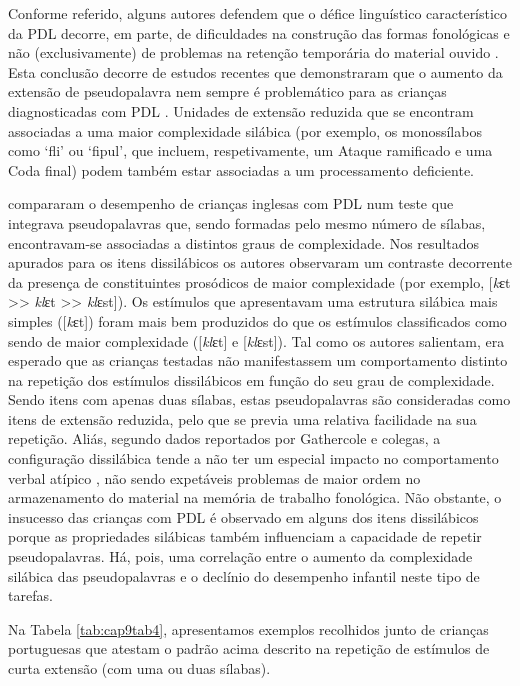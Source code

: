 \documentclass[output=paper,colorlinks,citecolor=brown,booklanguage=portuguese]{langscibook}
\begin{document}
Conforme referido, alguns autores defendem que o défice linguístico característico da PDL decorre, em parte, de dificuldades na construção das formas fonológicas e não (exclusivamente) de problemas na retenção temporária do material ouvido \citep{Almeida2019, Gallon2007, Marshall2002, Marshall2003, Marshall2009}. Esta conclusão decorre de estudos recentes que demonstraram que o aumento da extensão de pseudopalavra nem sempre é problemático para as crianças diagnosticadas com PDL \citep{Estes2007}. Unidades de extensão reduzida que se encontram associadas a uma maior complexidade silábica (por exemplo, os monossílabos como ‘fli’ ou ‘fipul’, que incluem, respetivamente, um Ataque ramificado e uma Coda final) podem também estar associadas a um processamento deficiente.

\citet{Gallon2007} compararam o desempenho de crianças inglesas com PDL num teste que integrava pseudopalavras que, sendo formadas pelo mesmo número de sílabas, encontravam-se associadas a distintos graus de complexidade. Nos resultados apurados para os itens dissilábicos os autores observaram um contraste decorrente da presença de constituintes prosódicos de maior complexidade (por exemplo, [\emph{k}ɛt  >> \emph{kl}ɛt >> \emph{kl}ɛst]). Os estímulos que apresentavam uma estrutura silábica mais simples ([\emph{k}ɛt]) foram mais bem produzidos do que os estímulos classificados como sendo de maior complexidade ([\emph{kl}ɛt] e [\emph{kl}ɛst]). Tal como os autores salientam, era esperado que as crianças testadas não manifestassem um comportamento distinto na repetição dos estímulos dissilábicos em função do seu grau de complexidade. Sendo itens com apenas duas sílabas, estas pseudopalavras são consideradas como itens de extensão reduzida, pelo que se previa uma relativa facilidade na sua repetição. Aliás, segundo dados reportados por Gathercole e colegas, a configuração dissilábica tende a não ter um especial impacto no comportamento verbal atípico \citep{Gathercole1990, Gathercole1994, Gathercole2006}, não sendo expetáveis problemas de maior ordem no armazenamento do material na memória de trabalho fonológica. Não obstante, o insucesso das crianças com PDL é observado em alguns dos itens dissilábicos porque as propriedades silábicas também influenciam a capacidade de repetir pseudopalavras. Há, pois, uma correlação entre o aumento da complexidade silábica das pseudopalavras e o declínio do desempenho infantil neste tipo de tarefas.

Na Tabela \ref{tab:cap9tab4}, apresentamos exemplos recolhidos junto de crianças portuguesas que atestam o padrão acima descrito na repetição de estímulos de curta extensão (com uma ou duas sílabas).
\end{document}
